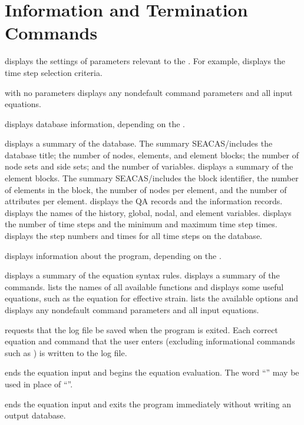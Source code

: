 \newpage
\section{Information and Termination Commands} \label{cmd:infoterm}

 {
 displays the settings of parameters relevant to the
. For example,  displays the time step
selection criteria.

 with no parameters displays any nondefault command parameters
and all input equations.
}

 {
 displays database information, depending on the
.

 {
displays a summary of the database. The summary SEACAS/includes the database
title; the number of nodes, elements, and element blocks; the number of
node sets and side sets; and the number of variables.
}
 {
displays a summary of the element blocks. The summary SEACAS/includes the block
identifier, the number of elements in the block, the number of nodes per
element, and the number of attributes per element.
}
 {
displays the QA records and the information records.
}
 {
displays the names of the history, global, nodal, and element variables.
}
 {
displays the number of time steps and the minimum and maximum time step
times.
}
 {
displays the step numbers and times for all time steps on the database.
}
}

\newpage %
 {
 displays information about the \caps{\PROGRAM} program,
depending on the .

 {
displays a summary of the equation syntax rules.
}
 {
displays a summary of the commands.
}
 {
lists the names of all available functions and displays some useful
equations, such as the equation for effective strain.
}
 {
lists the available  options and displays any nondefault
command parameters and all input equations.
}
}

 {
 requests that the log file be saved when the program is
exited. Each correct equation and command that the user enters
(excluding informational commands such as ) is written to the
log file.
}

 {
 ends the equation input and begins the equation evaluation.
The word ``'' may be used in place of ``''.
}

 {
 ends the equation input and exits the program immediately
without writing an output database.
}
